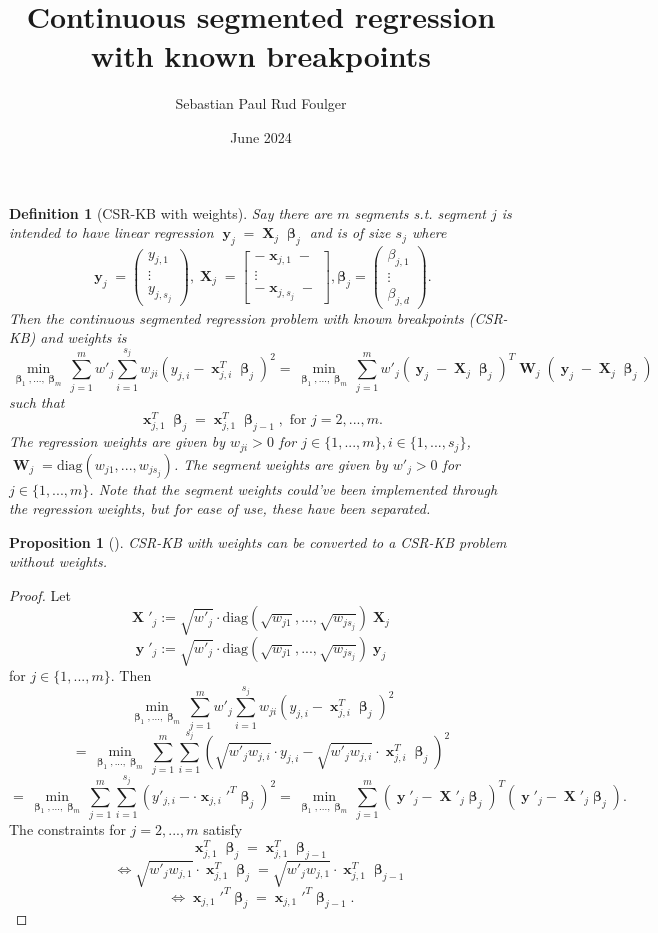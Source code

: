 \documentclass[12pt]{article}
\title{Continuous segmented regression with known breakpoints}
\author{Sebastian Paul Rud Foulger}
\date{June 2024}
\DeclareMathOperator{\bx}{\mathbf{x}}
\DeclareMathOperator{\bX}{\mathbf{X}}
\DeclareMathOperator{\by}{\mathbf{y}}
\DeclareMathOperator{\bW}{\mathbf{W}}
\DeclareMathOperator{\bbeta}{\boldsymbol{\beta}}
\newtheorem{defn}{Definition}
\newtheorem{prop}{Proposition}
\begin{document}
\begin{defn}[CSR-KB with weights]
Say there are $m$ segments s.t. segment $j$ is intended to have linear regression $\by_j = \bX_j \bbeta_j$ and is of size $s_j$ where
$$\by_j = \begin{pmatrix}
y_{j,1} \\
\vdots \\
y_{j,s_j}
\end{pmatrix}, \bX_j = 
\begin{bmatrix}
-\bx_{j,1}-  \\
\vdots \\
-\bx_{j,s_j}-
\end{bmatrix}, \boldsymbol{\beta}_j = 
\begin{pmatrix}
\beta_{j,1}  \\
\vdots \\
\beta_{j,d}
\end{pmatrix}.$$
Then the continuous segmented regression problem with known breakpoints (CSR-KB) and weights is
$$\min_{\bbeta_1,...,\bbeta_m} \sum_{j=1}^m w'_j\sum_{i=1}^{s_j} w_{ji}(y_{j, i}-\bx_{j, i}^T\bbeta_j)^2 = \min_{\bbeta_1,...,\bbeta_m} \sum_{j=1}^m w'_j (\by_j-\bX_j\bbeta_j)^T\bW_j(\by_j-\bX_j\bbeta_j)$$
such that
$$\bx_{j, 1}^T \bbeta_j = \bx_{j, 1}^T \bbeta_{j-1}, \text{ for }j=2, ..., m.$$
The regression weights are given by $w_{ji} > 0$ for $j\in \{1, ..., m\}, i \in \{1, ..., s_j\}$, $\bW_j = \text{diag}(w_{j1}, ..., w_{js_j})$. The segment weights are given by $w'_j > 0$ for $j \in \{1, ..., m\}$. Note that the segment weights could've been implemented through the regression weights, but for ease of use, these have been separated. 
\end{defn}
\begin{prop}[] \label{prop:convert}
CSR-KB with weights can be converted to a CSR-KB problem without weights.
\end{prop}
\begin{proof}
Let
$$\bX'_j := \sqrt{w'_j} \cdot \text{diag}\left(\sqrt{w_{j1}}, ..., \sqrt{w_{js_j}}\right)\bX_j$$
$$\by'_j := \sqrt{w'_j} \cdot \text{diag}\left(\sqrt{w_{j1}}, ..., \sqrt{w_{js_j}}\right)\by_j$$
for $j \in \{1, ..., m\}$. Then
$$\min_{\bbeta_1,...,\bbeta_m} \sum_{j=1}^m w'_j\sum_{i=1}^{s_j} w_{ji}(y_{j, i}-\bx_{j, i}^T\bbeta_j)^2 $$
$$=\min_{\bbeta_1,...,\bbeta_m} \sum_{j=1}^m \sum_{i=1}^{s_j} \left(\sqrt{w'_j w_{j,i}} \cdot y_{j, i}-\sqrt{w'_j w_{j,i}} \cdot \bx_{j, i}^T\bbeta_j \right)^2 $$
$$=\min_{\bbeta_1,...,\bbeta_m} \sum_{j=1}^m \sum_{i=1}^{s_j} \left(y'_{j, i}- \cdot \bx_{j, i}'^T\bbeta_j \right)^2=\min_{\bbeta_1,...,\bbeta_m} \sum_{j=1}^m (\by'_j-\bX'_j\bbeta_j)^T(\by'_j-\bX'_j\bbeta_j).$$
The constraints for $j=2, ..., m$ satisfy
$$\bx_{j, 1}^T \bbeta_j = \bx_{j, 1}^T \bbeta_{j-1}$$
$$\iff \sqrt{w'_j w_{j,1}} \cdot \bx_{j, 1}^T \bbeta_j = \sqrt{w'_j w_{j,1}} \cdot \bx_{j, 1}^T \bbeta_{j-1} $$
$$\iff \bx_{j, 1}'^T \bbeta_j = \bx_{j, 1}'^T \bbeta_{j-1}.$$
\end{proof}
\end{document}

